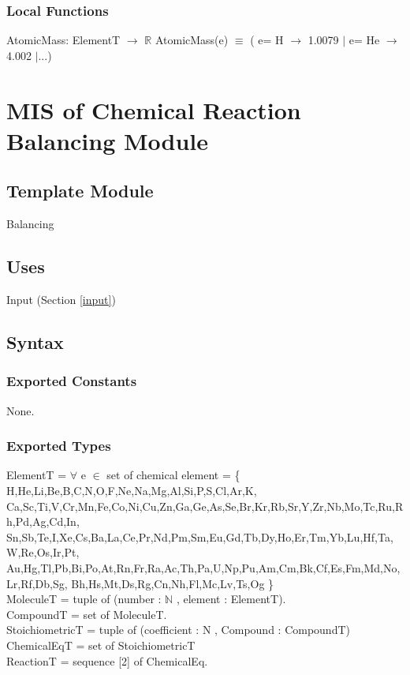 \documentclass[12pt, titlepage]{article}
\begin{document}
\subsubsection{Local Functions}
AtomicMass: ElementT $\rightarrow$ $\mathbb{R}$ 
\newline
AtomicMass(e) $\equiv$ ( e= H $\rightarrow$ 1.0079 $\vert$  e= He $\rightarrow$ 4.002 $\vert$...)  

\newpage

\section{MIS of Chemical Reaction Balancing Module} \label{balancing} 

\subsection{Template Module}

Balancing

\subsection{Uses}

 Input (Section \ref{input})

\subsection{Syntax}

\subsubsection{Exported Constants}

None.

\subsubsection{Exported Types}

ElementT = $\forall$ e $\in$ set of chemical element = 
\{ H,He,Li,Be,B,C,N,O,F,Ne,Na,Mg,Al,Si,P,S,Cl,Ar,K,
Ca,Sc,Ti,V,Cr,Mn,Fe,Co,Ni,Cu,Zn,Ga,Ge,As,Se,Br,Kr,Rb,Sr,Y,Zr,Nb,Mo,Tc,Ru,Rh,Pd,Ag,Cd,In,
Sn,Sb,Te,I,Xe,Cs,Ba,La,Ce,Pr,Nd,Pm,Sm,Eu,Gd,Tb,Dy,Ho,Er,Tm,Yb,Lu,Hf,Ta,W,Re,Os,Ir,Pt,
Au,Hg,Tl,Pb,Bi,Po,At,Rn,Fr,Ra,Ac,Th,Pa,U,Np,Pu,Am,Cm,Bk,Cf,Es,Fm,Md,No,Lr,Rf,Db,Sg,
Bh,Hs,Mt,Ds,Rg,Cn,Nh,Fl,Mc,Lv,Ts,Og \} \\
\newline 
MoleculeT = tuple of (number :  $\mathbb{N}$ , element : ElementT).\\
\newline 
CompoundT = set of MoleculeT.\\
\newline 
StoichiometricT = tuple of (coefficient : N , Compound : CompoundT)\\
\newline
ChemicalEqT = set of StoichiometricT\\
\newline
ReactionT = sequence [2] of ChemicalEq.\\
\end{document}
